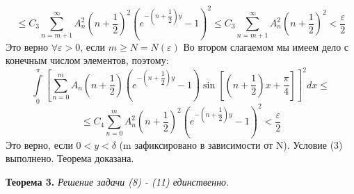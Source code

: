 \documentclass[12pt, a4paper]{article}
\begin{document}
	\begin{equation*}
		\leq  C_3 \sum\limits_{n=m+1}^{\infty} A_n^2 \left(n+\dfrac12\right)^2 \left(e^{-\left(n+\dfrac12\right)y} - 1\right)^2 \leq C_3 \sum\limits_{n=m+1}^{\infty} A_n^2 \left(n+\dfrac12\right)^2 < \dfrac{\varepsilon}{2}
	\end{equation*}
	Это верно $\forall \varepsilon > 0$, если $m \geq N =N(\varepsilon)$\newline
	Во втором слагаемом мы имеем дело с конечным числом элементов, поэтому:
	\begin{equation*}
		\int\limits_0^\pi \left[	\sum\limits_{n=0}^{m} A_n\left(n+\dfrac12\right) \left( e^{-\left(n+\dfrac12\right)y} - 1\right) \sin{\left[\left(n+\dfrac12\right) x  + \dfrac\pi4\right]} \right]^2 dx \leq
	\end{equation*}
	\begin{equation*}
		\leq C_4 \sum\limits_{n=0}^{m} A_n^2 \left(n +\dfrac12\right)^2 \left(e^{-\left(n+\dfrac12\right)y} - 1\right)^2 < \dfrac{\varepsilon}{2}
	\end{equation*}
	Это верно, если $0 < y < \delta$ (m зафиксировано в зависимости от N). Условие (3) выполнено. Теорема доказана.

\textbf{Теорема 3.} \textit{Решение задачи (8) - (11) единственно.}
\end{document}

